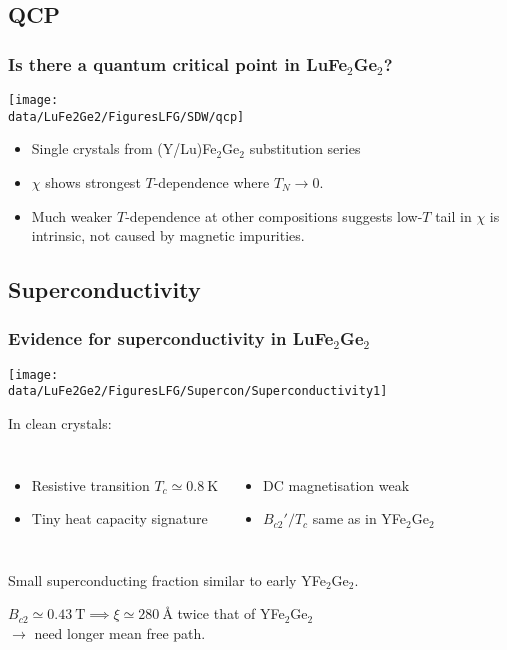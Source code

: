 \subsection{QCP}
\begin{frame}[label=QCP]
\frametitle{Is there a quantum critical point in LuFe$_2$Ge$_2$?}
\centerline{\texttt{[image: \\data/LuFe2Ge2/FiguresLFG/SDW/qcp]}}

\begin{itemize}
\item
Single crystals from (Y/Lu)Fe$_2$Ge$_2$ substitution series
\item
$\chi$ shows strongest $T$-dependence where $T_N \rightarrow 0$.
\item
Much weaker $T$-dependence at other compositions suggests low-$T$ tail in $\chi$ is intrinsic, not caused by magnetic impurities.
\end{itemize}
\end{frame}


\subsection{Superconductivity}
\begin{frame}[label=LFGSupercon]
\frametitle{Evidence for superconductivity in LuFe$_2$Ge$_2$}
\centerline{\texttt{[image: \\data/LuFe2Ge2/FiguresLFG/Supercon/Superconductivity1]}}

In clean crystals:
\begin{columns}[t]
\begin{itemize}
\item Resistive transition $T_c \simeq \SI{0.8}{\kelvin}$
\item Tiny heat capacity signature
\end{itemize}
\begin{itemize}
\item DC magnetisation weak
\item $B_{c2}'/T_c$ same as in YFe$_2$Ge$_2$
\end{itemize}
\end{columns}

\begin{center}
{Small superconducting fraction similar to early YFe$_2$Ge$_2$.} \\
\end{center}

$B_{c2} \simeq \SI{0.43}{\tesla} \implies \xi \simeq \SI{280}{\angstrom}$ twice that of YFe$_2$Ge$_2$ \\
\raggedleft $\rightarrow$ need longer mean free path. 
\end{frame}



